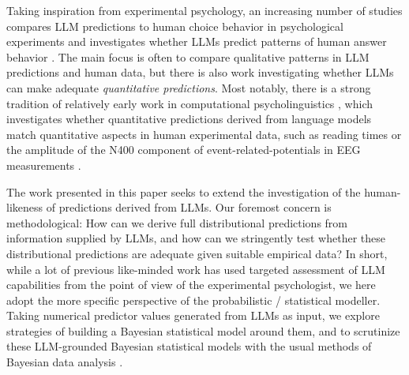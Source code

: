 \documentclass[fleqn]{article}
\begin{document}
Taking inspiration from experimental psychology, an increasing number of studies compares LLM predictions to human choice behavior in psychological experiments and investigates whether LLMs predict patterns of human answer behavior  \citep[e.g.,][]{BinzSchulz2023:Using-cognitive,Hagendorff2023:Machine-Psychol,ShiffrinMitchell2023:Probing-the-psy}.
The main focus is often to compare qualitative patterns in LLM predictions and human data, but there is also work investigating whether LLMs can make adequate \emph{quantitative predictions}.
Most notably, there is a strong tradition of relatively early work in computational psycholinguistics \citep{MarvinLinzen2018:Targeted-Syntac,HuGauthier2020:A-Systematic-As}, which investigates whether quantitative predictions derived from language models match quantitative aspects in human experimental data, such as reading times \citep{WilcoxVani2021:A-Targeted-Asse} or the amplitude of the N400 component of event-related-potentials in EEG measurements \citep{LindborgRabovsky2021:Meaning-in-brai}.

The work presented in this paper seeks to extend the investigation of the human-likeness of predictions derived from LLMs.
Our foremost concern is methodological: How can we derive full distributional predictions from information supplied by LLMs, and how can we stringently test whether these distributional predictions are adequate given suitable empirical data?
In short, while a lot of previous like-minded work has used targeted assessment of LLM capabilities from the point of view of the experimental psychologist, we here adopt the more specific perspective of the probabilistic / statistical modeller.
Taking numerical predictor values generated from LLMs as input, we explore strategies of building a Bayesian statistical model around them, and to scrutinize these LLM-grounded Bayesian statistical models with the usual methods of Bayesian data analysis \citep{GelmanCarlin2014:Bayesian-Data-A}.
\end{document}
